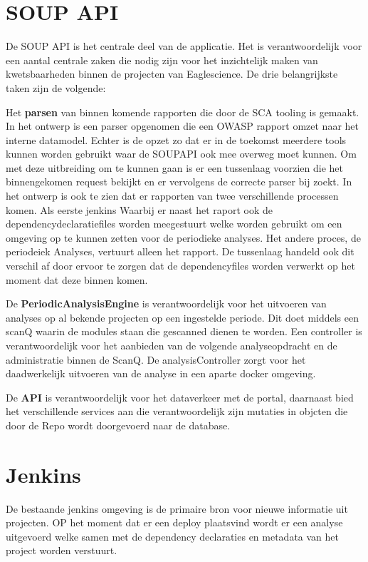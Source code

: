 \section{SOUP API}\label{sec:soup-api} De SOUP API is het centrale deel van de applicatie.
Het is verantwoordelijk voor een aantal centrale zaken die nodig zijn voor het inzichtelijk maken van kwetsbaarheden binnen de projecten van Eaglescience.
De drie belangrijkste taken zijn de volgende:

Het \textbf{parsen} van binnen komende rapporten die door de SCA tooling is gemaakt. In het ontwerp is een parser opgenomen die een OWASP rapport omzet naar het interne datamodel. Echter is de opzet zo dat er in de toekomst meerdere tools kunnen worden gebruikt waar de SOUPAPI ook mee overweg moet kunnen.
Om met deze uitbreiding om te kunnen gaan is er een tussenlaag voorzien die het binnengekomen request bekijkt en er vervolgens de correcte parser bij zoekt. In het ontwerp is ook te zien dat er rapporten van twee verschillende processen komen. Als eerste jenkins Waarbij er naast het raport ook de dependencydeclaratiefiles worden meegestuurt welke worden gebruikt om een omgeving op te kunnen zetten voor de periodieke analyses. Het andere proces,  de periodeiek Analyses,  vertuurt alleen het rapport. De tussenlaag handeld ook dit verschil af door ervoor te zorgen dat de dependencyfiles worden verwerkt op het moment dat deze binnen komen.

De \textbf{PeriodicAnalysisEngine} is verantwoordelijk voor het uitvoeren van analyses op al bekende projecten op een ingestelde periode. Dit doet middels een scanQ waarin de modules staan die gescanned dienen te worden. Een controller is verantwoordelijk voor het aanbieden van de volgende analyseopdracht en de administratie binnen de ScanQ. De analysisController zorgt voor het daadwerkelijk uitvoeren van de analyse in een aparte docker omgeving.

De \textbf{API} is verantwoordelijk voor het dataverkeer met de portal, daarnaast bied het verschillende services aan die verantwoordelijk zijn mutaties in objcten die door de Repo wordt doorgevoerd naar de database.

\section{Jenkins}\label{sec:jenkins}
De bestaande jenkins omgeving is de primaire bron voor nieuwe informatie uit projecten. OP het moment dat er een deploy plaatsvind wordt er een analyse uitgevoerd welke samen met de dependency declaraties en metadata van het project worden verstuurt.

